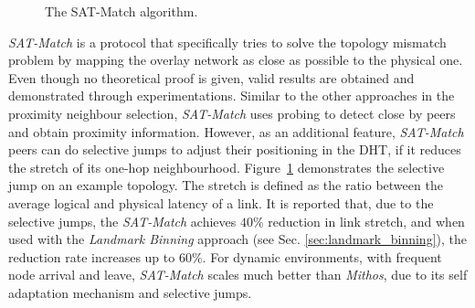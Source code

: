 \begin{figure}[ht]
\centering
{}\qquad\qquad
{}
\caption{The SAT-Match algorithm.}
\label{figure:sat_match}
\end{figure}

\textit{SAT-Match} \cite{ren_satmatch_2004} is a protocol that specifically
tries to solve the topology mismatch problem by mapping the overlay network as
close as possible to the physical one. Even though no theoretical proof is
given, valid results are obtained and demonstrated through experimentations.
Similar to the other approaches in the proximity neighbour selection,
\textit{SAT-Match} uses probing to detect close by peers and obtain proximity
information. However, as an additional feature, \textit{SAT-Match} peers can do
selective jumps to adjust their positioning in the DHT, if it reduces the stretch
of its one-hop neighbourhood. Figure~\ref{figure:sat_match} demonstrates the
selective jump on an example topology. The stretch is defined as the ratio
between the average logical and physical latency of a link. It is reported that,
due to the selective jumps, the \textit{SAT-Match} achieves $40\%$ reduction in
link stretch, and when used with the \textit{Landmark Binning} approach (see
Sec. \ref{sec:landmark_binning}), the reduction rate increases up to $60\%$.
For dynamic environments, with frequent node arrival and leave,
\textit{SAT-Match} scales much better than \textit{Mithos}, due to its self
adaptation mechanism and selective jumps.

